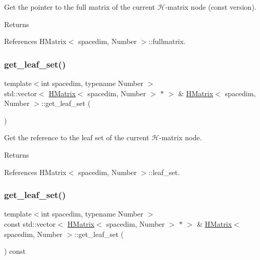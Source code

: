 Get the pointer to the full matrix of the current $\mathcal{H}$-\/matrix node (const version). \begin{DoxyReturn}{Returns}

\end{DoxyReturn}


References H\+Matrix$<$ spacedim, Number $>$\+::fullmatrix.

\mbox{\label{classHMatrix_ac5c9102fc04997c1ae3627185379d9bb}} 
\subsubsection{\texorpdfstring{get\+\_\+leaf\+\_\+set()}{get\_leaf\_set()}\hspace{0.1cm}{\footnotesize\ttfamily [1/2]}}
{\footnotesize\ttfamily template$<$int spacedim, typename Number $>$ \\
std\+::vector$<$ \hyperlink{classHMatrix}{H\+Matrix}$<$ spacedim, Number $>$ $\ast$ $>$ \& \hyperlink{classHMatrix}{H\+Matrix}$<$ spacedim, Number $>$\+::get\+\_\+leaf\+\_\+set (\begin{DoxyParamCaption}{ }\end{DoxyParamCaption})}

Get the reference to the leaf set of the current $\mathcal{H}$-\/matrix node. \begin{DoxyReturn}{Returns}

\end{DoxyReturn}


References H\+Matrix$<$ spacedim, Number $>$\+::leaf\+\_\+set.

\mbox{\label{classHMatrix_a851d7bb3632bc1d18538d4d1dd5f6393}} 
\subsubsection{\texorpdfstring{get\+\_\+leaf\+\_\+set()}{get\_leaf\_set()}\hspace{0.1cm}{\footnotesize\ttfamily [2/2]}}
{\footnotesize\ttfamily template$<$int spacedim, typename Number $>$ \\
const std\+::vector$<$ \hyperlink{classHMatrix}{H\+Matrix}$<$ spacedim, Number $>$ $\ast$ $>$ \& \hyperlink{classHMatrix}{H\+Matrix}$<$ spacedim, Number $>$\+::get\+\_\+leaf\+\_\+set (\begin{DoxyParamCaption}{ }\end{DoxyParamCaption}) const}

